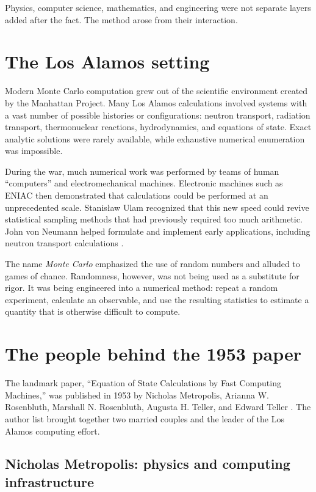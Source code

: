 \documentclass[11pt]{article}
\begin{document}
Physics, computer science, mathematics, and engineering were not separate
layers added after the fact. The method arose from their interaction.

\section{The Los Alamos setting}

Modern Monte Carlo computation grew out of the scientific environment created
by the Manhattan Project. Many Los Alamos calculations involved systems with a
vast number of possible histories or configurations: neutron transport,
radiation transport, thermonuclear reactions, hydrodynamics, and equations of
state. Exact analytic solutions were rarely available, while exhaustive
numerical enumeration was impossible.

During the war, much numerical work was performed by teams of human
``computers'' and electromechanical machines. Electronic machines such as ENIAC
then demonstrated that calculations could be performed at an unprecedented
scale. Stanis\l aw Ulam recognized that this new speed could revive statistical
sampling methods that had previously required too much arithmetic. John von
Neumann helped formulate and implement early applications, including neutron
transport calculations \cite{metropolis1987}.

The name \emph{Monte Carlo} emphasized the use of random numbers and alluded to
games of chance. Randomness, however, was not being used as a substitute for
rigor. It was being engineered into a numerical method: repeat a random
experiment, calculate an observable, and use the resulting statistics to
estimate a quantity that is otherwise difficult to compute.

\section{The people behind the 1953 paper}

The landmark paper, ``Equation of State Calculations by Fast Computing
Machines,'' was published in 1953 by Nicholas Metropolis, Arianna W.
Rosenbluth, Marshall N. Rosenbluth, Augusta H. Teller, and Edward Teller
\cite{metropolis1953}. The author list brought together two married couples and
the leader of the Los Alamos computing effort.

\subsection{Nicholas Metropolis: physics and computing infrastructure}
\end{document}
